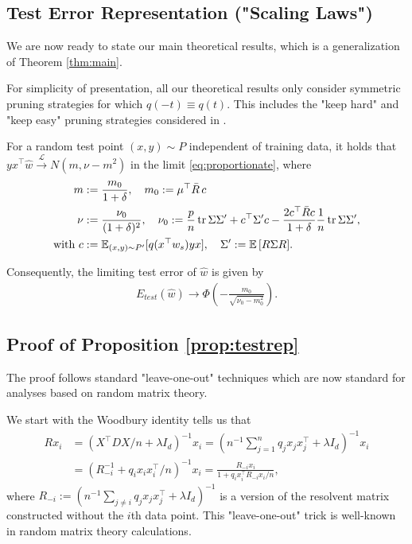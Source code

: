 \subsection{Test Error Representation ("Scaling Laws")}
We are now ready to state our main theoretical results, which is a generalization of Theorem \ref{thm:main}.

\begin{remark}
For simplicity of presentation, all our theoretical results only consider symmetric pruning strategies for which $q(-t) \equiv q(t)$. This includes the "keep hard" and "keep easy" pruning strategies considered in \citep{sorscher2022beyond}.
\end{remark}

\begin{proposition}
    For a random test point $(x,y) \sim P$ independent of training data, it holds that $yx^\top \hat w \overset{\mathcal L}{\to} N(m, \nu-m^2)$ in the limit \eqref{eq:proportionate}, where
\begin{align}
m &:= \frac{m_0}{1+\delta},\quad m_0 := \mu^\top \bar R\, c\\
\nu &:= \frac{\nu_0}{(1+\delta)^2},\quad \nu_0 :=\frac{p}{n}\operatorname{tr}\Sigma \Sigma' + c^\top \Sigma' c-\frac{2c^\top\bar R c}{1+\delta}\frac{1}{n}\operatorname{tr} \Sigma \Sigma',\\
\text{with }c &:= \mathbb E_{(x,y) \sim P'}[q(x^\top w_s)yx],\quad \Sigma' := \mathbb E\,[R\Sigma R].
\end{align}

Consequently, the limiting test error of $\hat w$ is given by 
\begin{eqnarray}
E_{test}(\hat w) \to \Phi\left(-\frac{m_0}{\sqrt{\nu_0-m_0^2}}\right).
\end{eqnarray}
\label{prop:testrep}
\end{proposition}

\subsection{Proof of Proposition \ref{prop:testrep}}
The proof follows standard \citep{Couillet_Liao_2022,Firdoussi2024} "leave-one-out" techniques which are now standard for analyses based on random matrix theory.

We start with the Woodbury identity tells us that
\begin{align*}
Rx_i &= (X^\top D X/n + \lambda I_d)^{-1}x_i = (n^{-1}\sum_{j=1}^nq_j x_jx_j^\top + \lambda I_d)^{-1}x_i\\
&= (R_{-i}^{-1} + q_ix_ix_i^\top/n)^{-1}x_i= \frac{R_{-i}x_i}{1+q_ix_i^\top R_{-i} x_i/n},
\end{align*}
where $R_{-i} := (n^{-1}\sum_{j \ne i}q_j x_jx_j^\top + \lambda I_d)^{-1}$ is a version of the resolvent matrix constructed without the $i$th data point. This "leave-one-out" trick is well-known in random matrix theory calculations. 


